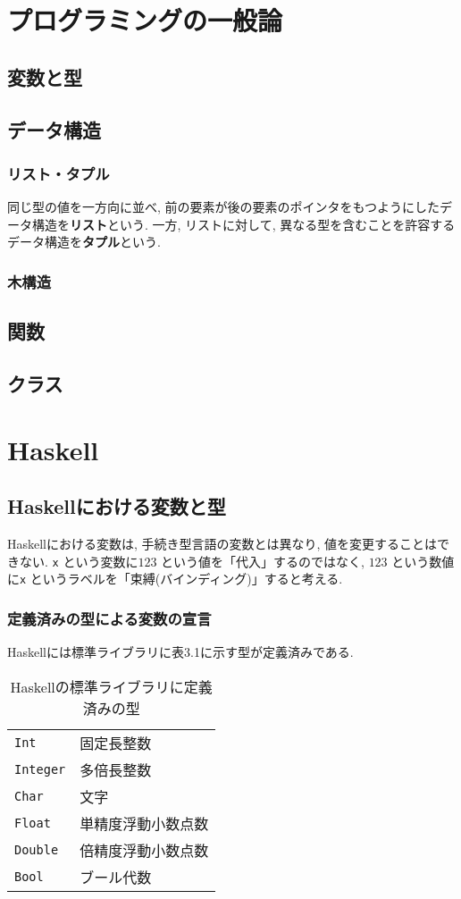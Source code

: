 \section{プログラミングの一般論}
\subsection{変数と型}
\subsection{データ構造}
\subsubsection{リスト・タプル}
同じ型の値を一方向に並べ, 前の要素が後の要素のポインタをもつようにしたデータ構造を{\bf リスト}という.
一方, リストに対して, 異なる型を含むことを許容するデータ構造を{\bf タプル}という.
\subsubsection{木構造}
\subsection{関数}
\subsection{クラス}
\section{Haskell}
\subsection{Haskellにおける変数と型}
Haskellにおける変数は, 手続き型言語の変数とは異なり, 値を変更することはできない. \verb|x| という変数に$123$ という値を「代入」するのではなく, $123$ という数値に\verb|x| というラベルを「束縛(バインディング)」すると考える.

\subsubsection{定義済みの型による変数の宣言}
Haskellには標準ライブラリに表3.1に示す型が定義済みである.
\begin{table}[htbp]
\caption{Haskellの標準ライブラリに定義済みの型}
\begin{center}
\begin{tabular}{ll}
\verb|Int|&固定長整数\\
\verb|Integer|&多倍長整数 \\
\verb|Char|&文字\\
\verb|Float|&単精度浮動小数点数\\
\verb|Double|&倍精度浮動小数点数\\
\verb|Bool|&ブール代数\\
\end{tabular}
\end{center}
\end{table}

